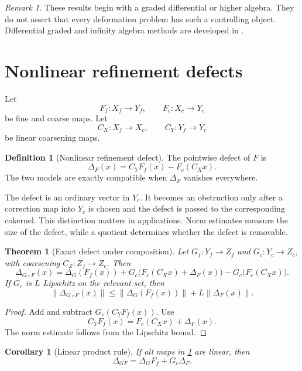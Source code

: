 \documentclass{aomart}
\newtheorem{theorem}{Theorem}[section]
\newtheorem{corollary}[corollary]{Corollary}
\theoremstyle{definition}
\newtheorem{definition}[definition]{Definition}
\theoremstyle{remark}
\newtheorem{remark}[remark]{Remark}
\begin{document}
\begin{remark}\label{rem:graded_boundary}
These results begin with a graded differential or higher algebra.  They do not assert that every deformation problem has such a controlling object.  Differential graded and infinity algebra methods are developed in \cite{LodayVallette2012}.
\end{remark}

\section{Nonlinear refinement defects}\label{sec:nonlinear_defects}

Let
\[
F_f:X_f\longrightarrow Y_f,
\qquad
F_c:X_c\longrightarrow Y_c
\]
be fine and coarse maps.  Let
\[
C_X:X_f\longrightarrow X_c,
\qquad
C_Y:Y_f\longrightarrow Y_c
\]
be linear coarsening maps.

\begin{definition}[Nonlinear refinement defect]\label{def:nonlinear_defect}
The pointwise defect of $F$ is
\[
\Delta_F(x)
=
C_YF_f(x)-F_c(C_Xx).
\]
The two models are exactly compatible when $\Delta_F$ vanishes everywhere.
\end{definition}


The defect is an ordinary vector in $Y_c$.  It becomes an obstruction only after a correction map into $Y_c$ is chosen and the defect is passed to the corresponding cokernel.  This distinction matters in applications.  Norm estimates measure the size of the defect, while a quotient determines whether the defect is removable.

\begin{theorem}[Exact defect under composition]\label{thm:defect_composition_identity}
Let $G_f:Y_f\to Z_f$ and $G_c:Y_c\to Z_c$, with coarsening $C_Z:Z_f\to Z_c$.  Then
\[
\Delta_{G\circ F}(x)
=
\Delta_G(F_f(x))
+
G_c\big(F_c(C_Xx)+\Delta_F(x)\big)
-
G_c\big(F_c(C_Xx)\big).
\]
If $G_c$ is $L$ Lipschitz on the relevant set, then
\[
\|\Delta_{G\circ F}(x)\|
\le
\|\Delta_G(F_f(x))\|
+
L\|\Delta_F(x)\|.
\]
\end{theorem}

\begin{proof}
Add and subtract $G_c(C_YF_f(x))$.  Use
\[
C_YF_f(x)=F_c(C_Xx)+\Delta_F(x).
\]
The norm estimate follows from the Lipschitz bound.
\end{proof}

\begin{corollary}[Linear product rule]\label{cor:linear_defect_product}
If all maps in \cref{thm:defect_composition_identity} are linear, then
\[
\Delta_{GF}
=
\Delta_G F_f+G_c\Delta_F.
\]
\end{corollary}
\end{document}
